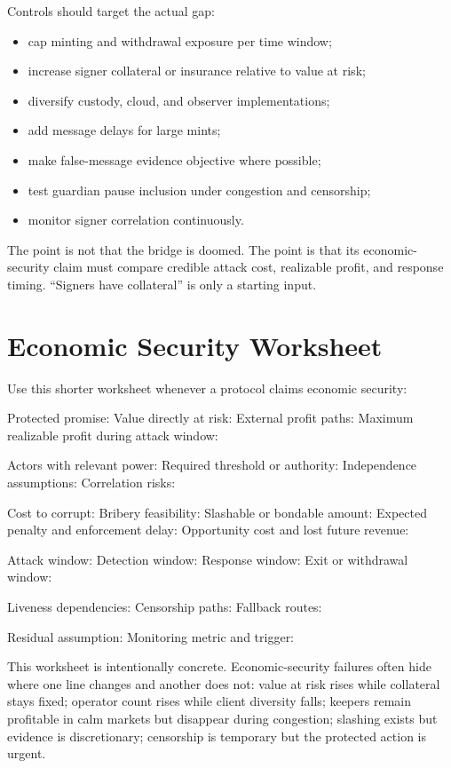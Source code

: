 Controls should target the actual gap:

\begin{itemize}
\item cap minting and withdrawal exposure per time window;
\item increase signer collateral or insurance relative to value at risk;
\item diversify custody, cloud, and observer implementations;
\item add message delays for large mints;
\item make false-message evidence objective where possible;
\item test guardian pause inclusion under congestion and censorship;
\item monitor signer correlation continuously.
\end{itemize}

The point is not that the bridge is doomed. The point is that its economic-security claim must compare credible attack cost, realizable profit, and response timing. ``Signers have collateral'' is only a starting input.

\section{Economic Security Worksheet}

Use this shorter worksheet whenever a protocol claims economic security:

\begin{codeblock}
Protected promise:
Value directly at risk:
External profit paths:
Maximum realizable profit during attack window:

Actors with relevant power:
Required threshold or authority:
Independence assumptions:
Correlation risks:

Cost to corrupt:
Bribery feasibility:
Slashable or bondable amount:
Expected penalty and enforcement delay:
Opportunity cost and lost future revenue:

Attack window:
Detection window:
Response window:
Exit or withdrawal window:

Liveness dependencies:
Censorship paths:
Fallback routes:

Residual assumption:
Monitoring metric and trigger:
\end{codeblock}

This worksheet is intentionally concrete. Economic-security failures often hide where one line changes and another does not: value at risk rises while collateral stays fixed; operator count rises while client diversity falls; keepers remain profitable in calm markets but disappear during congestion; slashing exists but evidence is discretionary; censorship is temporary but the protected action is urgent.

